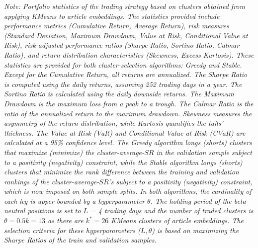 \begin{landscape}
\begin{table}[H]
\begin{minipage}{\textwidth}
\small\textit{Note: 
Portfolio statistics of the trading strategy based on clusters obtained from applying KMeans to article embeddings. 
The statistics provided include performance metrics (Cumulative Return, Average Return), risk measures (Standard Deviation, Maximum Drawdown, Value at Risk, Conditional Value at Risk), risk-adjusted performance ratios (Sharpe Ratio, Sortino Ratio, Calmar Ratio), and return distribution characteristics (Skewness, Excess Kurtosis). These statistics are provided for both cluster-selection algorithms: Greedy and Stable. 
Except for the Cumulative Return, all returns are annualized. The Sharpe Ratio is computed using the daily returns, assuming 252 trading days in a year. The Sortino Ratio is calculated using the daily downside returns. The Maximum Drawdown is the maximum loss from a peak to a trough. The Calmar Ratio is the ratio of the annualized return to the maximum drawdown. Skewness measures the asymmetry of the return distribution, while Kurtosis quantifies the tails' thickness. The Value at Risk (VaR) and Conditional Value at Risk (CVaR) are calculated at a 95\% confidence level.
The Greedy algorithm longs (shorts) clusters that maximize (minimize) the cluster-average-$SR$ in the validation sample subject to a positivity (negativity) constraint, while the Stable algorithm longs (shorts) clusters that minimize the rank difference between the training and validation rankings of the cluster-average-$SR$'s subject to a positivity (negativity) constraint, which is now imposed on both sample splits. In both algorithms, the cardinality of each leg is upper-bounded by a hyperparameter $\theta$. 
The holding period of the beta-neutral positions is set to $L$ = 4 trading days and the number of traded clusters is $\theta = 0.5k=13$ as there are $k^*=26$ KMeans clusters of article embeddings. The selection criteria for these hyperparameters ($L,\theta$) is based on maximizing the Sharpe Ratios of the train and validation samples.
}
\end{minipage}
\end{table}
\end{landscape}
